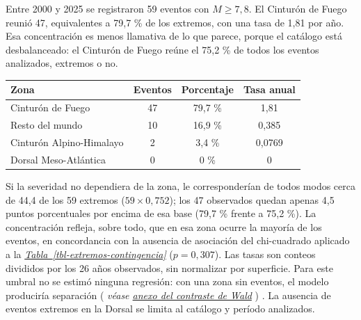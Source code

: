 \documentclass[
  spanish,
  letterpaper,
  DIV=11,
  numbers=noendperiod]{scrartcl}
\newcommand{\asesoriaStyledRef}[1]{%
  {\hypersetup{linkcolor=asesoriaLinkColor,urlcolor=asesoriaLinkColor,citecolor=asesoriaLinkColor}\textcolor{asesoriaLinkColor}{\emph{#1}}}%
}
\newcommand{\asesoriaParenRef}[1]{%
  \textnormal{\textcolor{asesoriaTextColor}{(}}%
  {\hypersetup{linkcolor=asesoriaLinkColor,urlcolor=asesoriaLinkColor,citecolor=asesoriaLinkColor}\textcolor{asesoriaTextColor}{\emph{#1}}}%
  \textnormal{\textcolor{asesoriaTextColor}{)}}%
}
\newcommand{\asesoriaTableLink}[1]{\hyperref[#1]{Tabla~\ref*{#1}}}
\newcommand{\asesoriaTableRef}[1]{\asesoriaStyledRef{\asesoriaTableLink{#1}}}
\begin{document}
\noindent
\begin{minipage}[t]{0.48\textwidth}
\vspace{0pt}
Entre 2000 y 2025 se registraron 59 eventos con \mbox{$M \geq 7{,}8$}. El Cinturón de Fuego reunió 47, equivalentes a 79,7 \% de los extremos, con una tasa de 1,81 por año. Esa concentración es menos llamativa de lo que parece, porque el catálogo está desbalanceado: el Cinturón de Fuego reúne el 75,2 \% de todos los eventos analizados, extremos o no.
\end{minipage}\hfill
\begin{minipage}[t]{0.48\textwidth}
\vspace{0pt}
\begingroup
\scriptsize
\centering
\setlength{\tabcolsep}{1.0pt}
\renewcommand{\arraystretch}{0.90}
{}
\label{tbl-extremos-tasas}
\hypertarget{dest-tbl-extremos-tasas}{}
\begin{tabular*}{\linewidth}{@{\extracolsep{\fill}}lccc@{}}
\toprule
Zona & Eventos & Porcentaje & Tasa anual \\
\midrule
Cinturón de Fuego        & 47 & 79,7 \% & 1,81 \\
Resto del mundo          & 10 & 16,9 \% & 0,385 \\
Cinturón Alpino-Himalayo &  2 & 3,4 \%  & 0,0769 \\
Dorsal Meso-Atlántica    &  0 & 0 \%    & 0 \\
\bottomrule
\end{tabular*}
\par\vspace{0.10em}
\endgroup
\end{minipage}
\par\vspace{-0.25em}

Si la severidad no dependiera de la zona, le corresponderían de todos
modos cerca de 44,4 de los 59 extremos (\(59 \times 0{,}752\)); los 47
observados quedan apenas 4,5 puntos porcentuales por encima de esa base
(79,7 \% frente a 75,2 \%). La concentración refleja, sobre todo, que en
esa zona ocurre la mayoría de los eventos, en concordancia con la
ausencia de asociación del chi-cuadrado aplicado a la
\asesoriaTableRef{tbl-extremos-contingencia} (\(p = 0{,}307\)). Las
tasas son conteos divididos por los 26 años observados, sin normalizar
por superficie. Para este umbral no se estimó ninguna regresión: con una
zona sin eventos, el modelo produciría separación
\asesoriaParenRef{véase \hyperref[sec-anexo-wald]{anexo del contraste de Wald}}.
La ausencia de eventos extremos en la Dorsal se limita al catálogo y
período analizados.
\end{document}
